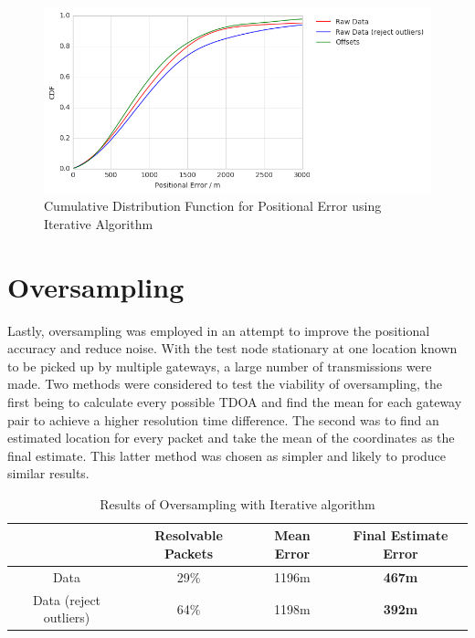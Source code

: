 \documentclass[a4paper]{report}
\begin{document}
    \begin{figure}[ht]
    \centering
    \includegraphics[width=14cm]{figures/iterativecdf.png}
    \caption{Cumulative Distribution Function for Positional Error using Iterative Algorithm}
    \label{fig:iterrorcdf}
    \end{figure}


  \section{Oversampling}

    Lastly, oversampling was employed in an attempt to improve the positional accuracy and reduce noise. With the test node stationary at one location known to be picked up by multiple gateways, a large number of transmissions were made. Two methods were considered to test the viability of oversampling, the first being to calculate every possible TDOA and find the mean for each gateway pair to achieve a higher resolution time difference. The second was to find an estimated location for every packet and take the mean of the coordinates as the final estimate. This latter method was chosen as simpler and likely to produce similar results.

    \begin{table}[ht]
      \begin{center}
        \caption{Results of Oversampling with Iterative algorithm}
        \label{tab:osresults}
        \begin{tabular}{|c|c|c|>{\bfseries}c|}
          \hline
           & Resolvable Packets & Mean Error &  Final Estimate Error \\
          \hline
          Data & 29\% & 1196m & 467m \\
          \hline
          Data (reject outliers) & 64\% & 1198m & 392m \\
          \hline
        \end{tabular}
      \end{center}
    \end{table}
\end{document}
